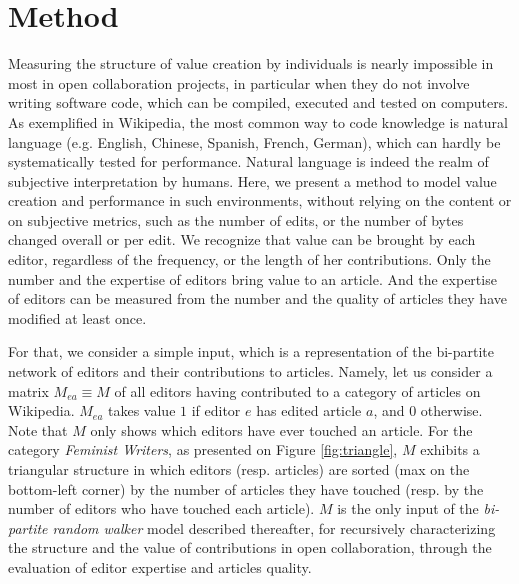 \section{Method}
\label{method}
Measuring the structure of value creation by individuals is nearly impossible in most in open collaboration projects, in particular when they do not involve writing software code, which can be compiled, executed and tested on computers. As exemplified in Wikipedia, the most common way to code knowledge is natural language (e.g. English, Chinese, Spanish, French, German), which can hardly be systematically tested for performance. Natural language is indeed the realm of subjective interpretation by humans. Here, we present a method to model value creation and performance in such environments, without relying on the content or on subjective metrics, such as the number of edits, or the number of bytes changed overall or per edit. We recognize that value can be brought by each editor, regardless of the frequency, or the length of her contributions. Only the number and the expertise of editors bring value to an article.  And the expertise of editors can be measured from the number and the quality of articles they have modified at least once.

For that, we consider a simple input, which is a representation of the bi-partite network of editors and their contributions to articles.  Namely, let us consider a matrix $M_{ea} \equiv M$ of all editors having contributed to a category of articles on Wikipedia. $M_{ea}$ takes value $1$ if editor $e$ has edited article $a$, and $0$ otherwise. Note that $M$ only shows which editors have ever touched an article. For the category {\it Feminist Writers}, as presented on Figure \ref{fig:triangle}, $M$ exhibits a triangular structure in which editors (resp. articles) are sorted (max on the bottom-left corner) by the number of articles they have touched (resp. by the number of editors who have touched each article). $M$ is the only input of the {\it bi-partite random walker} model described thereafter, for recursively characterizing the structure and the value of contributions in open collaboration, through the evaluation of editor expertise and articles quality.

